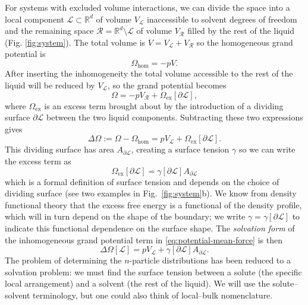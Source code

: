 \documentclass[11pt,twoside]{report}
\begin{document}
For systems with excluded volume interactions, we can divide the space into a local component $\mathcal{L} \subset \mathbb{R}^d$ of volume $V_\mathcal{L}$ inaccessible to solvent degrees of freedom and the remaining space $\mathcal{R} = \mathbb{R}^d \setminus \mathcal{L}$ of volume $V_\mathcal{R}$ filled by the rest of the liquid (Fig. \ref{fig:system}).
The total volume is $V = V_\mathcal{L} + V_\mathcal{R}$ so the homogeneous grand potential is
\begin{equation*}
  \Omega_\mathrm{hom} = -p V.
\end{equation*}
After inserting the inhomogeneity the total volume accessible to the rest of the liquid will be reduced by $V_\mathcal{L}$, so the grand potential becomes
\begin{equation*}
  \Omega = -p V_\mathcal{R} + \Omega_\mathrm{ex}[\partial\mathcal{L}],
\end{equation*}
where $\Omega_\mathrm{ex}$ is an excess term brought about by the introduction of a dividing surface $\partial\mathcal{L}$ between the two liquid components.
Subtracting these two expressions gives
\begin{equation*}
  \Delta \Omega
  := \Omega - \Omega_\mathrm{hom}
  = p V_\mathcal{L} + \Omega_\mathrm{ex}[\partial\mathcal{L}].
\end{equation*}
This dividing surface has area $A_{\partial\mathcal{L}}$, creating a surface tension $\gamma$ so we can write the excess term as
\begin{equation*}
  \Omega_\mathrm{ex}[\partial\mathcal{L}] =
  \gamma[\partial\mathcal{L}] A_{\partial\mathcal{L}}
\end{equation*}
which is a formal definition of surface tension and depends on the choice of dividing surface (see two examples in Fig.\ \ref{fig:system}b).
We know from density functional theory \cite{EvansAP1979} that the excess free energy is a functional of the density profile, which will in turn depend on the shape of the boundary; we write $\gamma = \gamma[\partial \mathcal{L}]$ to indicate this functional dependence on the surface shape.
The \emph{solvation form} of the inhomogeneous grand potential term in \eqref{eq:potential-mean-force} is then
\begin{equation}\label{eq:surface-tension}
  \Delta \Omega[\mathcal{L}] =
  p V_\mathcal{L} + \gamma[{\partial\mathcal{L}}] A_{\partial\mathcal{L}}.
\end{equation}
The problem of determining the $n$-particle distributions has been reduced to a solvation problem: we must find the surface tension between a solute (the specific local arrangement) and a solvent (the rest of the liquid).
We will use the solute--solvent terminology, but one could also think of local--bulk nomenclature.
\end{document}

